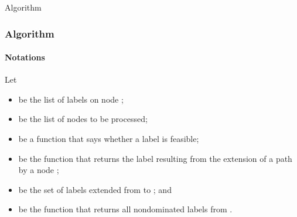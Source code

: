 \begin{frame}
  \begin{center}
    \Huge Algorithm
  \end{center}
\end{frame}

\begin{frame}
  \frametitle{Algorithm}
  \framesubtitle{Notations}
  Let
  \begin{itemize}
    \item {} be the list of labels on node ;
    \item {} be the list of nodes to be processed;
    \item \blue{\[
        f(S_i) =  
        \begin{cases}
          \text{\textcolor{black}{true}},  & \text{\textcolor{black}{if} }      \forall r \in R (l_i^r \leqslant e_i^r) \wedge \forall j \in V (v_i^j \leqslant 1)\\
          \text{\textcolor{black}{false}}, & \text{\textcolor{black}{otherwise}}
        \end{cases}
    \]} be a function that says whether a label is feasible;
\item {}  be the function that returns the label resulting from the extension of a path  by a node ;
    \item {} be the set of labels extended from  to ; and
    \item {} be the function that returns all nondominated labels from \blue{$\Lambda$}.
  \end{itemize}
\end{frame}

